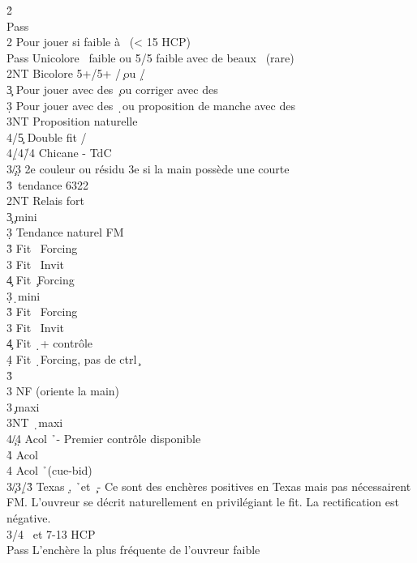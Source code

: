 \documentclass[a4paper]{article}
\begin{document}
\begin{bidtable}
2\h\+\\
Pass\\
2\s \> Pour jouer si faible à \s\ (< 15 HCP)\+\\
Pass \> Unicolore \s\ faible ou 5/5 faible avec de beaux \s\ (rare)\\
2NT \> Bicolore 5+/5+ \s /\c\ ou \s /\d \+\\
3\c \> Pour jouer avec des \c\ ou corriger avec des \d \\
3\d \> Pour jouer avec des \d\ ou proposition de manche avec des \c \\
3NT \> Proposition naturelle\\
4/5\c \> Double fit \s /\c \\
4\d/4\h/4\s \> Chicane - TdC\-\\
3\c/3\d \> 2e couleur ou résidu 3e si la main possède une courte\\
3\h {}\s\ tendance 6322\-\\
2NT \> Relais fort\+\\
3\c {}\c\ mini\+\\
3\d \> Tendance naturel FM\\
3\h \> Fit \s\ Forcing\\
3\s \> Fit \s\ Invit\\
4\c \> Fit \c\ Forcing\-\\
3\d {}\d\ mini\+\\
3\h \> Fit \s\ Forcing\\
3\s \> Fit \s\ Invit\\
4\c \> Fit \d\ + contrôle \c \\
4\d \> Fit \d\ Forcing, pas de ctrl \c \-\\
3\h {}\s \+\\
3\s \> NF (oriente la main)\-\\
3\s {}\c\ maxi\\
3NT \d\ maxi\\
4\c/4\d \> Acol \h\ - Premier contrôle disponible\\
4\h \> Acol \h \\
4\s \> Acol \h\ (cue-bid)\-\\
3\c/3\d/3\h \> Texas \d , \h\ et \c\ - Ce sont des enchères positives en Texas mais pas nécessairent FM. L'ouvreur se décrit naturellement en privilégiant le fit. La rectification est négative.\\
3\s {}/4 \s\ et 7-13 HCP\+\\
Pass \> L'enchère la plus fréquente de l'ouvreur faible\\

\end{bidtable}
\end{document}
